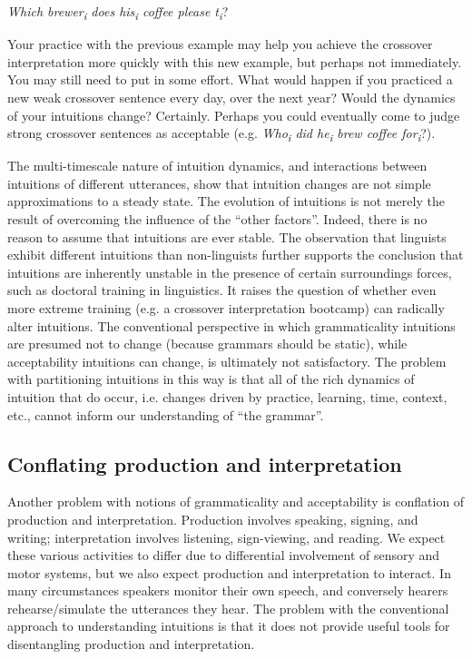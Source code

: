     \textit{Which brewer\textsubscript{i} does his\textsubscript{i} coffee please t\textsubscript{i}}?

  Your practice with the previous example may help you achieve the crossover interpretation more quickly with this new example, but perhaps not immediately. You may still need to put in some effort. What would happen if you practiced a new weak crossover sentence every day, over the next year? Would the dynamics of your intuitions change? Certainly. Perhaps you could eventually come to judge strong crossover sentences as acceptable (e.g. \textit{Who\textsubscript{i} did he\textsubscript{i} brew coffee for\textsubscript{i}}?). 

  The multi-timescale nature of intuition dynamics, and interactions between intuitions of different utterances, show that intuition changes are not simple approximations to a steady state. The evolution of intuitions is not merely the result of overcoming the influence of the “other factors”. Indeed, there is no reason to assume that intuitions are ever stable. The observation that linguists exhibit different intuitions than non-linguists \citep{Spencer1973} further supports the conclusion that intuitions are inherently unstable in the presence of certain surroundings forces, such as doctoral training in linguistics. It raises the question of whether even more extreme training (e.g. a crossover interpretation bootcamp) can radically alter intuitions. The conventional perspective in which grammaticality intuitions are presumed not to change (because grammars should be static), while acceptability intuitions can change, is ultimately not satisfactory. The problem with partitioning intuitions in this way is that all of the rich dynamics of intuition that do occur, i.e. changes driven by practice, learning, time, context, etc., cannot inform our understanding of “the grammar”.

\subsection{Conflating production and interpretation}

Another problem with notions of grammaticality and acceptability is conflation of production and interpretation. Production involves speaking, signing, and writing; interpretation involves listening, sign-viewing, and reading. We expect these various activities to differ due to differential involvement of sensory and motor systems, but we also expect production and interpretation to interact. In many circumstances speakers monitor their own speech, and conversely hearers rehearse/simulate the utterances they hear. The problem with the conventional approach to understanding intuitions is that it does not provide useful tools for disentangling production and interpretation.


